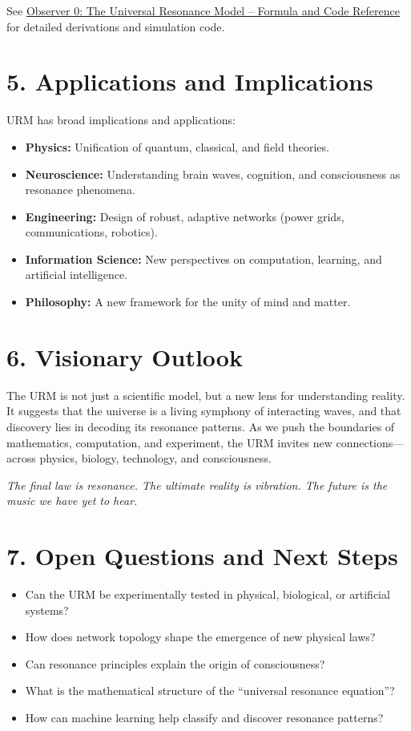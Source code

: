 \documentclass{article}
\begin{document}
See \href{https://doi.org/your-observer0-doi}{Observer 0: The Universal Resonance Model – Formula and Code Reference} for detailed derivations and simulation code.

\section*{5. Applications and Implications}

URM has broad implications and applications:
\begin{itemize}
    \item \textbf{Physics:} Unification of quantum, classical, and field theories.
    \item \textbf{Neuroscience:} Understanding brain waves, cognition, and consciousness as resonance phenomena.
    \item \textbf{Engineering:} Design of robust, adaptive networks (power grids, communications, robotics).
    \item \textbf{Information Science:} New perspectives on computation, learning, and artificial intelligence.
    \item \textbf{Philosophy:} A new framework for the unity of mind and matter.
\end{itemize}

\section*{6. Visionary Outlook}

The URM is not just a scientific model, but a new lens for understanding reality. It suggests that the universe is a living symphony of interacting waves, and that discovery lies in decoding its resonance patterns. As we push the boundaries of mathematics, computation, and experiment, the URM invites new connections—across physics, biology, technology, and consciousness.

\begin{center}
\textit{The final law is resonance. The ultimate reality is vibration. The future is the music we have yet to hear.}
\end{center}

\section*{7. Open Questions and Next Steps}

\begin{itemize}
    \item Can the URM be experimentally tested in physical, biological, or artificial systems?
    \item How does network topology shape the emergence of new physical laws?
    \item Can resonance principles explain the origin of consciousness?
    \item What is the mathematical structure of the “universal resonance equation”?
    \item How can machine learning help classify and discover resonance patterns?
\end{itemize}
\end{document}
